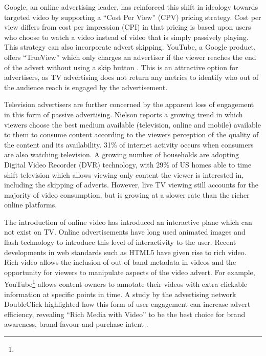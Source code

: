	Google, an online advertising leader, has reinforced this shift in ideology towards targeted video by supporting a ``Cost Per View'' (CPV) pricing strategy. Cost per view differs from cost per impression (CPI) in that pricing is based upon users who choose to watch a video instead of video that is simply passively playing. This strategy can also incorporate advert skipping. YouTube, a Google product, offers ``TrueView'' which only charges an advertiser if the viewer reaches the end of the advert without using a skip button \citep{trueview}. This is an attractive option for advertisers, as TV advertising does not return any metrics to identify who out of the audience reach is engaged by the advertisement.

	Television advertisers are further concerned by the apparent loss of engagement in this form of passive advertising. Nielson reports a growing trend in which viewers choose the best medium available (television, online and mobile) available to them to consume content according to the viewers perception of the quality of the content and its availability. 31\% of internet activity occurs when consumers are also watching television. A growing number of households are adopting Digital Video Recorder (DVR) technology, with 29\% of US homes able to time shift television which allows viewing only content the viewer is interested in, including the skipping of adverts. However, live TV viewing still accounts for the majority of video consumption, but is growing at a slower rate than the richer online platforms. \citep{three-screen}

	The introduction of online video has introduced an interactive plane which can not exist on TV. Online advertisements have long used animated images and flash technology to introduce this level of interactivity to the user. Recent developments in web standards such as HTML5 have given rise to rich video. Rich video allows the inclusion of out of band metadata in videos and the opportunity for viewers to manipulate aspects of the video advert. For example, YouTube\footnote{} allows content owners to annotate their videos with extra clickable information at specific points in time. A study by the advertising network DoubleClick highlighted how this form of user engagement can increase advert efficiency, revealing ``Rich Media with Video'' to be the best choice for brand awareness, brand favour and purchase intent \citep{rich-video}.

